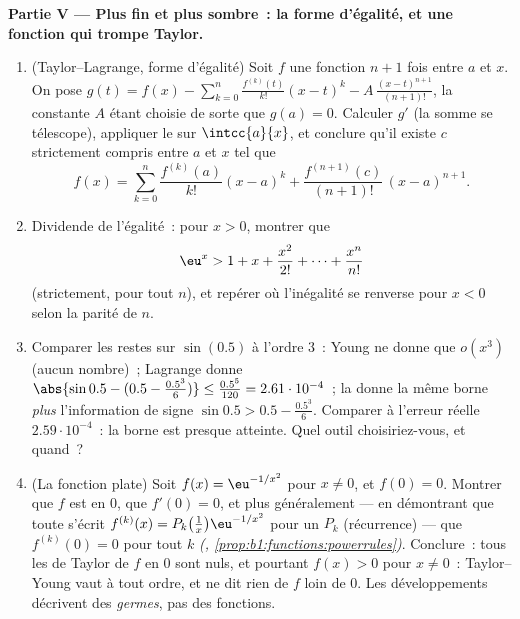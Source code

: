 \begin{problem}
\medskip
\noindent\textbf{Partie V --- Plus fin et plus sombre~: la forme
d'égalité, et une fonction qui trompe Taylor.}
\begin{enumerate}[resume]
  \item (Taylor--Lagrange, forme d'égalité) Soit $f$ une fonction
        $n + 1$ fois  entre $a$ et $x$. On pose $g(t) =
        f(x) - \sum_{k=0}^{n} \frac{f^{(k)}(t)}{k!}(x - t)^k -
        A\,\frac{(x-t)^{n+1}}{(n+1)!}$, la constante $A$ étant
        choisie de sorte que $g(a) = 0$. Calculer $g'$ (la somme
        se télescope), appliquer le  sur
        $\intcc{a}{x}$, et conclure qu'il existe $c$ strictement
        compris entre $a$ et $x$ tel que
        \[
        f(x) = \sum_{k=0}^{n} \frac{f^{(k)}(a)}{k!}(x-a)^k
        + \frac{f^{(n+1)}(c)}{(n+1)!}\,(x-a)^{n+1} .
        \]
  \item Dividende de l'égalité~: pour $x > 0$, montrer que
        \[
        \eu^x > 1 + x + \frac{x^2}{2!} + \dots +
        \frac{x^n}{n!}
        \]
        (strictement, pour tout $n$), et repérer où l'inégalité se
        renverse pour $x < 0$ selon la parité
        de $n$.
  \item Comparer les restes sur $\sin(0.5)$ à l'ordre $3$~:
        Young ne donne que $o(x^3)$ (aucun nombre)~; Lagrange donne
        $\abs{\sin 0.5 - (0.5 - \frac{0.5^3}{6})} \leq
        \frac{0.5^5}{120} = 2.61\cdot10^{-4}$~; la  donne la même borne \emph{plus} l'information de
        signe $\sin 0.5 > 0.5 - \frac{0.5^3}{6}$. Comparer
        à l'erreur réelle $2.59\cdot10^{-4}$~: la borne est presque
        atteinte. Quel outil choisiriez-vous, et
        quand~?
  \item (La fonction plate) Soit $f(x) = \eu^{-1/x^2}$ pour $x
        \neq 0$, et $f(0) = 0$. Montrer que $f$ est  en $0$,
        que $f'(0) = 0$, et plus généralement --- en démontrant que
        toute  s'écrit $f^{(k)}(x) =
        P_k\bigl(\frac1x\bigr)\eu^{-1/x^2}$ pour un 
        $P_k$ (récurrence) --- que $f^{(k)}(0) = 0$ pour tout $k$
        \emph{(,
        \cref{prop:b1:functions:powerrules})}. Conclure~: tous les
         de Taylor de $f$ en $0$ sont nuls, et pourtant
        $f(x) > 0$ pour $x \neq 0$~: Taylor--Young vaut à tout ordre,
        et ne dit rien de $f$ loin de $0$. Les développements
        décrivent des \emph{germes}, pas des fonctions.
\end{enumerate}


\end{problem}
